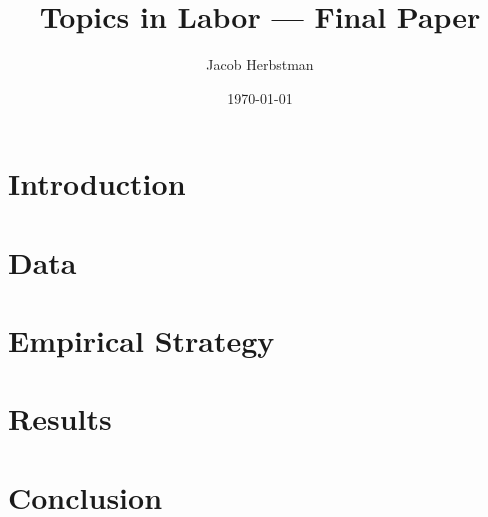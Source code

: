 \documentclass{article}
\title{Topics in Labor --- Final Paper}
\author{Jacob Herbstman}
\date{\today}
\begin{document}
\maketitle

\begin{abstract}

\end{abstract}

\section{Introduction}



\section{Data}



\section{Empirical Strategy}



\section{Results}



\section{Conclusion}





\end{document}
